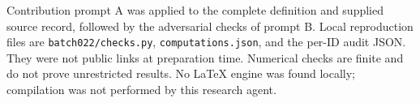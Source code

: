 \documentclass[11pt]{article}
\begin{document}
Contribution prompt A was applied to the complete definition and supplied source record, followed by the adversarial checks of prompt B. Local reproduction files are \texttt{batch022/checks.py}, \texttt{computations.json}, and the per-ID audit JSON. They were not public links at preparation time. Numerical checks are finite and do not prove unrestricted results. No LaTeX engine was found locally; compilation was not performed by this research agent.
\end{document}
